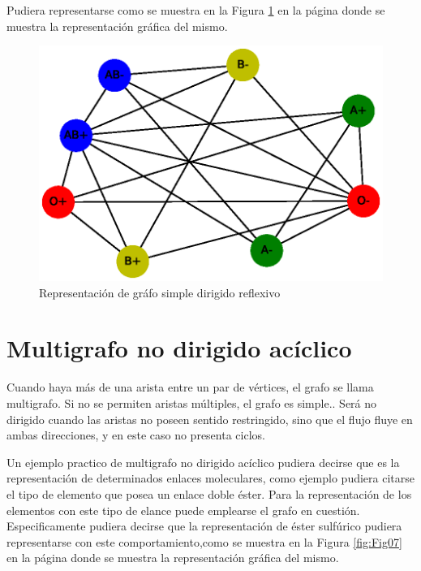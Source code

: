 \documentclass{article}
\begin{document}
Pudiera representarse como se muestra en la Figura \ref{fig:Fig06} en la página \pageref{fig:Fig06} donde se muestra la representación gráfica del mismo. 



\begin{figure}
    \centering
    \includegraphics[scale=0.6]{imagenes/Fig06.eps}
    \caption{Representación de gráfo simple dirigido reflexivo}
    \label{fig:Fig06}
\end{figure}

\section{Multigrafo no dirigido acíclico}

Cuando haya más de una arista entre un par de vértices, el grafo se llama multigrafo. Si no se permiten
aristas múltiples, el grafo es simple.\cite{Elisa}. Será no dirigido cuando las aristas no poseen sentido restringido, sino que el flujo fluye en ambas direcciones, y en este caso no presenta ciclos.

Un ejemplo practico de multigrafo no dirigido acíclico pudiera decirse que es la representación de determinados enlaces moleculares, como ejemplo pudiera citarse el tipo de elemento que posea un enlace doble éster. Para la representación de los elementos con este tipo de elance puede emplearse el grafo en cuestión. Especificamente pudiera decirse que la representación de éster sulfúrico pudiera representarse con este comportamiento,como se muestra en la Figura \ref{fig:Fig07} en la página \pageref{fig:Fig07} donde se muestra la representación gráfica del mismo. 
\end{document}
